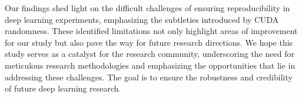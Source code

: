 Our findings shed light on the difficult challenges of ensuring reproducibility in deep learning experiments, emphasizing the subtleties introduced by CUDA randomness. These identified limitations not only highlight areas of improvement for our study but also pave the way for future research directions. We hope this study serves as a catalyst for the research community, underscoring the need for meticulous research methodologies and emphasizing the opportunities that lie in addressing these challenges. The goal is to ensure the robustness and credibility of future deep learning research.
